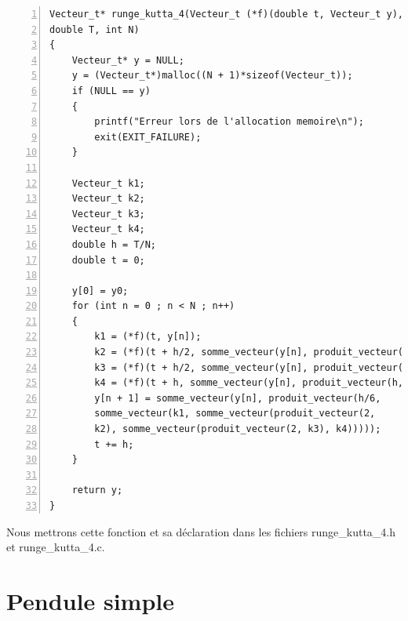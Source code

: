 \documentclass[9pt,a4paper]{article}
\begin{document}
\begin{Verbatim}[numbers=left, frame=single]
Vecteur_t* runge_kutta_4(Vecteur_t (*f)(double t, Vecteur_t y), Vecteur_t y0,
double T, int N)
{
    Vecteur_t* y = NULL;
    y = (Vecteur_t*)malloc((N + 1)*sizeof(Vecteur_t));
    if (NULL == y)
    {
        printf("Erreur lors de l'allocation memoire\n");
        exit(EXIT_FAILURE);
    }

    Vecteur_t k1;
    Vecteur_t k2;
    Vecteur_t k3;
    Vecteur_t k4;
    double h = T/N;
    double t = 0;

    y[0] = y0;
    for (int n = 0 ; n < N ; n++)
    {
        k1 = (*f)(t, y[n]);
        k2 = (*f)(t + h/2, somme_vecteur(y[n], produit_vecteur(h/2, k1)));
        k3 = (*f)(t + h/2, somme_vecteur(y[n], produit_vecteur(h/2, k2)));
        k4 = (*f)(t + h, somme_vecteur(y[n], produit_vecteur(h, k3)));
        y[n + 1] = somme_vecteur(y[n], produit_vecteur(h/6,
        somme_vecteur(k1, somme_vecteur(produit_vecteur(2,
        k2), somme_vecteur(produit_vecteur(2, k3), k4)))));
        t += h;
    }

    return y;
}
\end{Verbatim}
Nous mettrons cette fonction et sa déclaration dans les fichiers runge\_kutta\_4.h et runge\_kutta\_4.c.
\section{Pendule simple}
\end{document}
